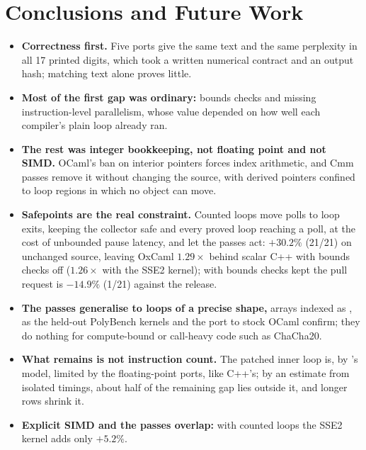 \section{Conclusions and Future Work}
\label{sec:conclusion}

\begin{itemize}
  \item \textbf{Correctness first.} Five ports give the same text and the same
        perplexity in all 17 printed digits, which took a written numerical
        contract and an output hash; matching text alone proves little.
  \item \textbf{Most of the first gap was ordinary:} bounds checks and missing
        instruction-level parallelism, whose value depended on how well each
        compiler's plain loop already ran.
  \item \textbf{The rest was integer bookkeeping, not floating point and not
        SIMD.} OCaml's ban on interior pointers forces index arithmetic, and
        Cmm passes remove it without changing the source, with derived
        pointers confined to loop regions in which no object can move.
  \item \textbf{Safepoints are the real constraint.} Counted loops move polls
        to loop exits, keeping the collector safe and every proved loop
        reaching a poll, at the cost of unbounded pause latency, and
        let the passes act: $+30.2\%$ (21/21) on unchanged source,
        leaving OxCaml $1.29\times$ behind scalar C++ with bounds checks
        off ($1.26\times$ with the SSE2 kernel); with bounds checks
        kept the pull request is $-14.9\%$ (1/21)
        against the release.
  \item \textbf{The passes generalise to loops of a precise shape,} arrays
        indexed as , as the held-out PolyBench
        kernels and the port to stock OCaml confirm; they do nothing for
        compute-bound or call-heavy code such as ChaCha20.
  \item \textbf{What remains is not instruction count.} The patched inner loop
        is, by 's model, limited by the floating-point ports,
        like C++'s; by an estimate from isolated timings, about half of the
        remaining gap lies outside it, and longer rows shrink it.
  \item \textbf{Explicit SIMD and the passes overlap:} with counted loops the
        SSE2 kernel adds only $+5.2\%$.
\end{itemize}

